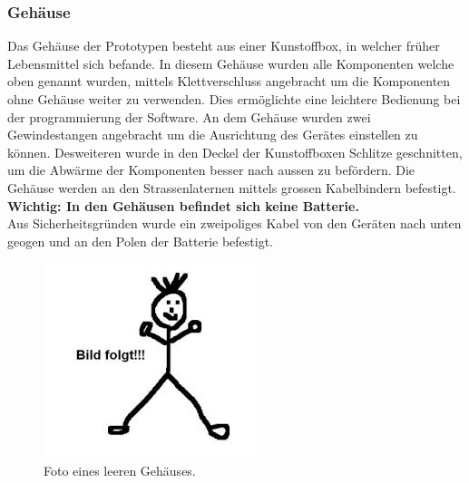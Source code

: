 \subsubsection{Gehäuse}
Das Geh\"ause der Prototypen besteht aus einer Kunstoffbox, in welcher fr\"uher Lebensmittel sich befande. In diesem Geh\"ause wurden alle Komponenten welche oben genannt wurden, mittels Klettverschluss angebracht um die Komponenten ohne Geh\"ause weiter zu verwenden. Dies erm\"oglichte eine leichtere Bedienung bei der programmierung der Software. An dem Geh\"ause wurden zwei Gewindestangen angebracht um die Ausrichtung des Ger\"ates einstellen zu k\"onnen. Desweiteren wurde in den Deckel der Kunstoffboxen Schlitze geschnitten, um die Abw\"arme der Komponenten besser nach aussen zu bef\"ordern. Die Geh\"ause werden an den Strassenlaternen mittels grossen Kabelbindern befestigt.\\
\textbf{Wichtig: In den Geh\"ausen befindet sich keine Batterie.}\\
Aus Sicherheitsgr\"unden wurde ein zweipoliges Kabel von den Ger\"aten nach unten geogen und an den Polen der Batterie befestigt. 

\begin{figure}[H]
  \centering
  \includegraphics[height=0.49\textwidth]{Hardware/Gehaeuse.jpg} 
  \caption{Foto eines leeren Geh\"auses.}
  \label{bArchitektur}
\end{figure}
